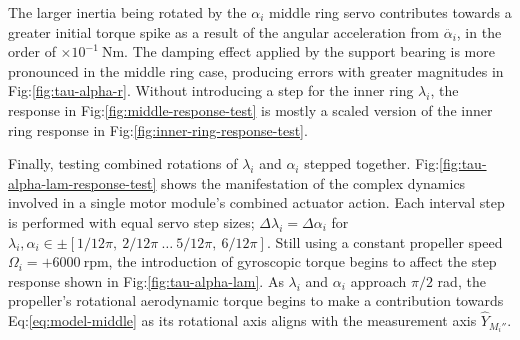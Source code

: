 \par
The larger inertia being rotated by the $\alpha_i$ middle ring servo contributes towards a greater initial torque spike as a result of the angular acceleration from $\ddot{\alpha_i}$, in the order of $\times 10^{-1}~\text{Nm}$. The damping effect applied by the support bearing is more pronounced in the middle ring case, producing errors with greater magnitudes in Fig:\ref{fig:tau-alpha-r}. Without introducing a step for the inner ring $\lambda_i$, the response in Fig:\ref{fig:middle-response-test} is mostly a scaled version of the inner ring response in Fig:\ref{fig:inner-ring-response-test}.
\par
Finally, testing combined rotations of $\lambda_i$ and $\alpha_i$ stepped together. Fig:\ref{fig:tau-alpha-lam-response-test} shows the manifestation of the complex dynamics involved in a single motor module's combined actuator action. Each interval step is performed with equal servo step sizes; $\Delta\lambda_i=\Delta\alpha_i$ for $\lambda_i,\alpha_i\in\pm[1/12\pi,~2/12\pi~\ldots~5/12\pi,~6/12\pi]$. Still using a constant propeller speed $\Omega_i=+6000~\text{rpm}$, the introduction of gyroscopic torque begins to affect the step response shown in Fig:\ref{fig:tau-alpha-lam}. As $\lambda_i$ and $\alpha_i$ approach $\pi/2$ rad, the propeller's rotational aerodynamic torque begins to make a contribution towards Eq:\ref{eq:model-middle} as its rotational axis aligns with the measurement axis $\hat{Y}_{M_i''}$.

